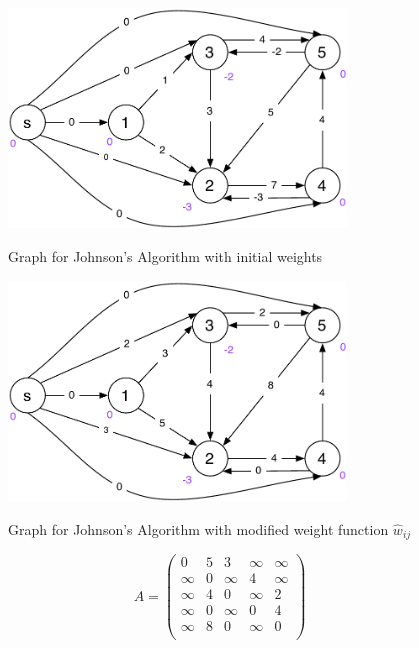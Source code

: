 \documentclass[a4paper, 12pt]{article}
\begin{document}
\begin{figure}[htbp]
    \caption{Graph for Johnson's Algorithm with initial weights}
    \vskip 0.2cm
    \centering
    \includegraphics[width=0.8\textwidth]{Figures/Exercise_10_Initial}
    \label{figure:Exercise_10_Initial}
\end{figure}

\begin{figure}[htbp]
    \caption{
        Graph for Johnson's Algorithm with modified weight function
        $\hat{w}_{ij}$
    }
    \vskip 0.2cm
    \centering
    \includegraphics[width=0.8\textwidth]{Figures/Exercise_10_Modified_Weights}
    \label{figure:Exercise_10_Modified_Weights}
\end{figure}

\[
A =
\left(
    \begin{array}{cccccc}
       0   &   5   &   3   &   ∞   &  ∞    \\
       ∞   &   0   &   ∞   &   4   &  ∞    \\
       ∞   &   4   &   0   &   ∞   &  2    \\
       ∞   &   0   &   ∞   &   0   &  4    \\
       ∞   &   8   &   0   &   ∞   &  0    \\
    \end{array}
\right)
\]
\end{document}
